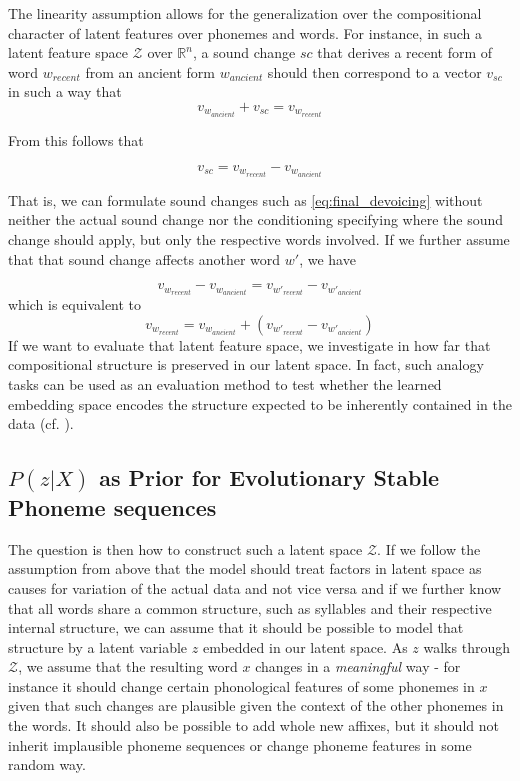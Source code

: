 \documentclass[8pt]{article}
\begin{document}
The linearity assumption allows for the generalization over the compositional character of latent features over phonemes and words. For instance, in such a latent feature space $\mathcal{Z}$ over $\mathbb{R}^n$, a sound change $sc$ that derives a recent form of word $w_{recent}$ from an ancient form  $w_{ancient}$ should then correspond to a vector $v_{sc}$ in such a way that 
\begin{equation}
\label{eq:sound_change_linear_dependency}
v_{w_{ancient}}+v_{sc} = v_{w_{recent}}
\end{equation}

From this follows that 

\begin{equation}
v_{sc} =  v_{w_{recent}} - v_{w_{ancient}} 
\end{equation}

That is, we can formulate sound changes such as \ref{eq:final_devoicing} without neither the actual sound change nor the conditioning specifying where the sound change should apply, but only the respective words involved.
If we further assume that that sound change affects another word $w'$, we have

\begin{equation}
v_{w_{recent}} - v_{w_{ancient}}  =  v_{w'_{recent}} - v_{w'_{ancient}} 
\end{equation}
which is equivalent to
\begin{equation}
v_{w_{recent}}  =   v_{w_{ancient}}  + (v_{w'_{recent}} - v_{w'_{ancient}}) 
\end{equation}
If we want to evaluate that latent feature space, we investigate in how far that compositional structure is preserved in our latent space. In fact, such analogy tasks can be used as an evaluation method to test whether the learned embedding space encodes the structure expected to be inherently contained in the data (cf. \cite{mikolov2013distributed}).

\subsection{$P(z|X)$ as Prior for Evolutionary Stable Phoneme sequences}

The question is then how to construct such a latent space $\mathcal{Z}$. If we follow the assumption from above that the model should treat factors in latent space as causes for variation of the actual data and not vice versa and if we further know that all words share a common structure, such as syllables and their respective internal structure, we can assume that it should be possible to model that structure by a latent variable $z$ embedded in our latent space. As $z$ walks through $\mathcal{Z}$, we assume that the resulting word $x$ changes in a \textit{meaningful} way - for instance it should change certain phonological features of some phonemes in $x$ given that such changes are plausible given the context of the other phonemes in the words. It should also be possible to add whole new affixes, but it should not inherit implausible phoneme sequences or change phoneme features in some random way. 
\end{document}
